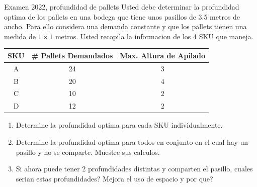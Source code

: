 \begin{enunciado}{Examen 2022, profundidad de pallets}
Usted debe determinar la profundidad optima de los pallets en una bodega que tiene unos pasillos de 3.5 metros de ancho. Para ello considera una demanda constante y que los pallets tienen una medida de $1\times 1$ metros. Usted recopila la informacion de los 4 SKU que maneja.

\begin{center}
\begin{tabular}{c|cc}
\toprule
SKU & \# Pallets Demandados & Max. Altura de Apilado\\
\midrule
A & 24 & 3\\
B & 20 & 4\\
C & 10 & 2\\
D & 12 & 2\\
\bottomrule
\end{tabular}
\end{center}

\begin{enumerate}[label=\roman*.]
  \item Determine la profundidad optima para cada SKU individualmente.
  \item Determine la profundidad optima para todos en conjunto en el cual hay un pasillo y no se comparte. Muestre sus calculos.
  \item Si ahora puede tener 2 profundidades distintas y comparten el pasillo, cuales serian estas profundidades? Mejora el uso de espacio y por que?
\end{enumerate}
\end{enunciado}


